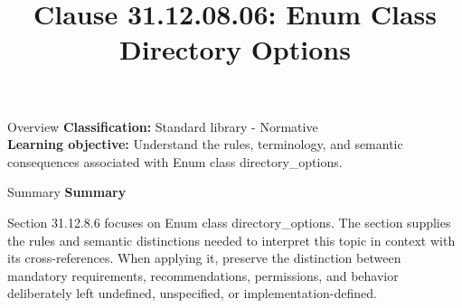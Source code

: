 \documentclass[10pt,letterpaper]{article}
\title{Clause 31.12.08.06: Enum Class Directory Options}
\author{}
\date{}
\begin{document}
\maketitle
\begin{CornellOverviewBox}{Overview}
\textbf{Classification:} Standard library - Normative\\[2pt]
\textbf{Learning objective:} Understand the rules, terminology, and semantic consequences associated with Enum class directory\_options.
\end{CornellOverviewBox}\begin{CornellSummaryBox}{Summary}
{\sffamily\bfseries\color{Accent} Summary}\par\vspace{3pt}Section 31.12.8.6 focuses on Enum class directory\_options. The section supplies the rules and semantic distinctions needed to interpret this topic in context with its cross-references. When applying it, preserve the distinction between mandatory requirements, recommendations, permissions, and behavior deliberately left undefined, unspecified, or implementation-defined.
\end{CornellSummaryBox}
\end{document}
